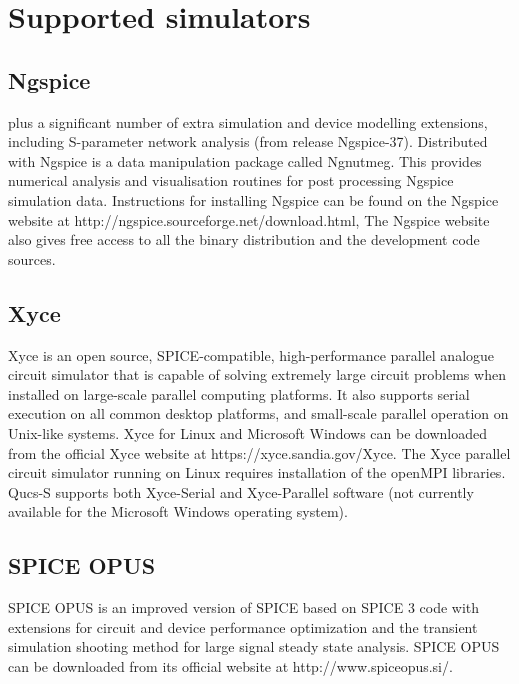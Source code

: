 \section{Supported simulators}
\subsection{Ngspice}
plus a significant number of extra simulation and device modelling extensions, including S-parameter network analysis (from release Ngspice-37).  Distributed with Ngspice is a data manipulation package called Ngnutmeg.  This provides numerical analysis and visualisation routines for post processing Ngspice simulation data. Instructions for installing Ngspice can be found on the Ngspice website at http://ngspice.sourceforge.net/download.html,  The Ngspice website also gives free access to all the binary distribution and the development code sources.
\subsection{Xyce}
Xyce is an open source, SPICE-compatible, high-performance parallel analogue circuit simulator that is capable of solving extremely large circuit problems when installed on large-scale parallel computing platforms.  It also supports serial execution on all common desktop platforms, and small-scale parallel operation on Unix-like systems.
Xyce for Linux and Microsoft Windows can be downloaded from the official Xyce website at https://xyce.sandia.gov/Xyce.
The Xyce parallel circuit simulator running on Linux requires installation of the openMPI libraries.  Qucs-S supports both Xyce-Serial and Xyce-Parallel software (not currently available for the Microsoft Windows operating system).
\subsection{SPICE OPUS}
SPICE OPUS is an improved version of SPICE based on SPICE 3 code with extensions for circuit and device performance optimization and the transient simulation shooting method for large signal steady state analysis.  SPICE OPUS can be downloaded from its official website at http://www.spiceopus.si/.
